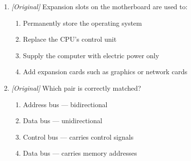 \documentclass[11pt]{article}
\begin{document}
\begin{enumerate}[label=\textbf{Q\arabic*.}, leftmargin=*]
\begin{enumerate}[label=\Roman*.]
    \item The data bus is bidirectional.
    \item The control bus carries control signals from the CPU to other
      units.
  \end{enumerate}
  \begin{enumerate}[label=\Alph*.]
    \item I only
    \item I and II only
    \item II and III only
    \item I, II and III
  \end{enumerate}
\item \textit{[Original]} Expansion slots on the motherboard are used to:
  \begin{enumerate}[label=\Alph*.]
    \item Permanently store the operating system
    \item Replace the CPU's control unit
    \item Supply the computer with electric power only
    \item Add expansion cards such as graphics or network cards
  \end{enumerate}
\item \textit{[Original]} Which pair is correctly matched?
  \begin{enumerate}[label=\Alph*.]
    \item Address bus --- bidirectional
    \item Data bus --- unidirectional
    \item Control bus --- carries control signals
    \item Data bus --- carries memory addresses
  \end{enumerate}


\end{enumerate}
\end{document}
